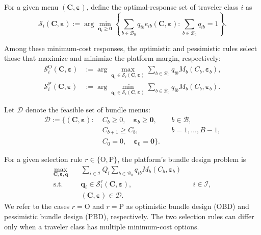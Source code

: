\documentclass{article}
\begin{document}
For a given menu $(\bm C,\bm\varepsilon)$, define the optimal-response set
of traveler class $i$ as
\begin{equation}
    \mathcal S_i(\bm C,\bm\varepsilon)
    :=
    \arg\min_{\bm q_i\geq\bm0}
    \left\{
        \sum_{b\in\mathcal B_0}
        q_{ib}e_{ib}(\bm C,\bm\varepsilon):
        \sum_{b\in\mathcal B_0}q_{ib}=1
    \right\}.
    \label{eq:bundle-choice-solution-set}
\end{equation}

Among these minimum-cost responses, the optimistic and pessimistic rules
select those that maximize and minimize the platform margin, respectively:
\begin{align}
    \mathcal S_i^{\mathrm O}(\bm C,\bm\varepsilon)
    &:=
    \arg\max_{\bm q_i\in\mathcal S_i(\bm C,\bm\varepsilon)}
    \sum_{b\in\mathcal B_0}
    q_{ib}M_b(C_b,\bm\varepsilon_b),
    \label{eq:optimistic-response-set}\\
    \mathcal S_i^{\mathrm P}(\bm C,\bm\varepsilon)
    &:=
    \arg\min_{\bm q_i\in\mathcal S_i(\bm C,\bm\varepsilon)}
    \sum_{b\in\mathcal B_0}
    q_{ib}M_b(C_b,\bm\varepsilon_b).
    \label{eq:pessimistic-response-set}
\end{align}

Let $\mathcal D$ denote the feasible set of bundle menus:
\begin{equation}
\begin{aligned}
    \mathcal D
    :=
    \bigl\{
    (\bm C,\bm\varepsilon):
    \;& C_b\geq0,\quad
       \bm\varepsilon_b\geq\bm0,
       && b\in\mathcal B,\\
    & C_{b+1}\geq C_b,
       && b=1,\ldots,B-1,\\
    & C_0=0,\quad
      \bm\varepsilon_0=\bm0
    \bigr\}.
\end{aligned}
\label{eq:bundle-menu-feasible-set}
\end{equation}

For a given selection rule $r\in\{\mathrm O,\mathrm P\}$, the platform's
bundle design problem is
\begin{align}
    \max_{\bm C,\bm\varepsilon,\bm q}
    \quad&
    \sum_{i\in\mathcal I}
    Q_i
    \sum_{b\in\mathcal B_0}
    q_{ib}M_b(C_b,\bm\varepsilon_b)
    \label{eq:bundle-design-objective}\\
    \text{s.t.}\quad&
    \bm q_i\in
    \mathcal S_i^r(\bm C,\bm\varepsilon),
    && i\in\mathcal I,
    \label{eq:bundle-design-response}\\
    &
    (\bm C,\bm\varepsilon)\in\mathcal D.
    \label{eq:bundle-design-menu}
\end{align}
We refer to the cases $r=\mathrm O$ and $r=\mathrm P$ as optimistic bundle
design (OBD) and pessimistic bundle design (PBD), respectively. The two selection rules can differ only when a traveler class has multiple minimum-cost options.
\end{document}
